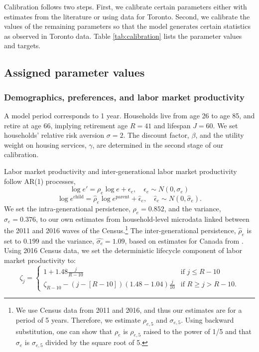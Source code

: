 \documentclass[parskip=full]{article}
\begin{document}
Calibration follows two steps. First, we calibrate certain parameters either with estimates from the literature or using data for Toronto. Second, we calibrate the values of the remaining parameters so that the model generates certain statistics as observed in Toronto data. Table \ref{tab:calibration} lists the parameter values and targets. 

\subsection{Assigned parameter values}

\subsubsection{Demographics, preferences, and labor market productivity}
A model period corresponds to 1 year. Households live from age 26 to age 85, and retire at age 66, implying retirement age $R=41$ and lifespan $J=60$. We set households' relative risk aversion $\sigma=2$. The discount factor, $\beta$, and the utility weight on housing services, $\gamma$, are determined in the second stage of our calibration.

Labor market productivity and inter-generational labor market productivity follow AR(1) processes,
\begin{equation*}
  \log e' = \rho_{e} \log e + \epsilon_{e},\quad \epsilon_{e}\sim N(0,\sigma_{e})
\end{equation*}
\begin{equation*}
\log e^{\text{child}} = \hat{\rho}_{e} \log e^{\text{parent}} + \hat{\epsilon}_{e},\quad \hat{\epsilon}_{e}\sim N(0,\hat{\sigma}_{e}).
\end{equation*}
We set the intra-generational persistence, $\rho_{e}=0.852$, and the variance, $\sigma_{e}=0.376$, to our own estimates from household-level microdata linked between the 2011 and 2016 waves of the Census.\footnote{We use Census data from 2011 and 2016, and thus our estimates are for a period of 5 years. Therefore, we estimate $\rho_{e,5}$ and $\sigma_{e,5}$. Using backward substitution, one can show that $\rho_{e}$ is $\rho_{e,5}$ raised to the power of 1/5 and that $\sigma_{e}$ is $\sigma_{e,5}$ divided by the square root of 5.} The inter-generational persistence, $\hat{\rho}_{e}$ is set to $0.199$ and the variance, $\hat{\sigma_{e}}=1.09$, based on estimates for Canada from \citet{corak-heisz-1999}. Using 2016 Census data, we set the deterministic lifecycle component of labor market productivity to: 
\begin{equation*}
\zeta_j = \begin{cases}
1+1.48 \frac{j}{R-10} &\text{if $j\leq R-10$}\\
\zeta_{R-10}-\left(j-\left[R-10\right]\right) (1.48-1.04) \frac{j}{10} &\text{if $R \geq j>R-10$}.
\end{cases}
\end{equation*}
\end{document}
